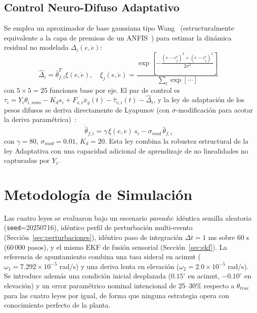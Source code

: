 \documentclass[journal]{IEEEtran}
\begin{document}
\subsection{Control Neuro-Difuso Adaptativo}
\label{sec:fuzzy}
Se emplea un aproximador de base gaussiana tipo
Wang~\cite{wang1992fuzzy,wang1993stable} (estructuralmente equivalente a
la capa de premisas de un ANFIS~\cite{jang1993anfis}) para estimar la
dinámica residual no modelada $\Delta_i(e,\dot e)$:
\begin{equation}
\hat\Delta_i = \hat\theta_{f,i}^T\xi(e,\dot e),\quad
\xi_j(e,\dot e) = \frac{\exp\!\left[-\frac{(e-c_j^e)^2+(\dot e-c_j^{\dot e})^2}{2\sigma^2}\right]}{\sum_l \exp[\cdots]}
\end{equation}
con $5\times5=25$ funciones base por eje. El par de control es
$\tau_i = Y_i\theta_{i,nom} - K_d s_i + F_{s,i}\ddot x_g(t) -\hat\tau_{v,i}(t) - \hat\Delta_i$,
y la ley de adaptación de los pesos difusos se deriva directamente de
Lyapunov (con $\sigma$-modificación para acotar la deriva
paramétrica)~\cite{spooner1996stable}:
\begin{equation}
\dot{\hat\theta}_{f,i} = \gamma\,\xi(e,\dot e)\,s_i - \sigma_{mod}\,\hat\theta_{f,i}
\end{equation}
con $\gamma=80$, $\sigma_{mod}=0.01$, $K_d=20$. Esta ley combina la
robustez estructural de la ley Adaptativa con una capacidad adicional de
aprendizaje de no linealidades no capturadas por $Y_i$.

\section{Metodología de Simulación}

Las cuatro leyes se evaluaron bajo un escenario \emph{pareado}: idéntica
semilla aleatoria (\texttt{seed}=20250716), idéntico perfil de
perturbación multi-evento (Sección~\ref{sec:perturbaciones}), idéntico
paso de integración $\Delta t=1$ ms sobre 60 s (60\,000 pasos), y el mismo
EKF de fusión sensorial (Sección~\ref{sec:ekf}). La referencia de
apuntamiento combina una tasa sideral en acimut
($\omega_1=7.292\times10^{-5}$ rad/s) y una deriva lenta en elevación
($\omega_2=2.0\times10^{-5}$ rad/s). Se introduce además una condición
inicial desplazada ($0.15^\circ$ en acimut, $-0.10^\circ$ en elevación) y
un error paramétrico nominal intencional de 25--30\% respecto a
$\theta_{true}$ para las cuatro leyes por igual, de forma que ninguna
estrategia opera con conocimiento perfecto de la planta.
\end{document}
